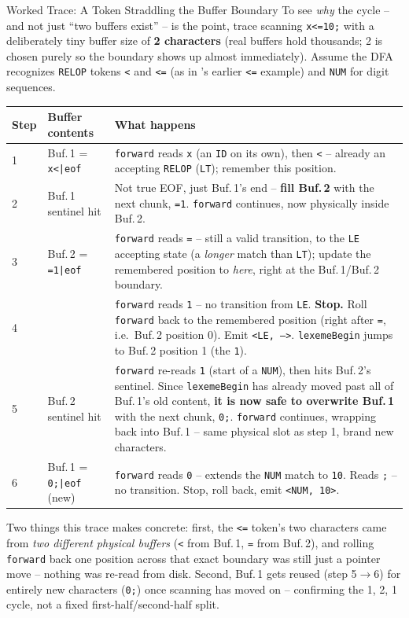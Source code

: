 \documentclass[full-course-notes.tex]{subfiles}
\begin{document}
\begin{examplebox}{Worked Trace: A Token Straddling the Buffer Boundary}
To see \emph{why} the cycle -- and not just ``two buffers exist'' -- is the point, trace
scanning \texttt{x<=10;} with a deliberately tiny buffer size of \textbf{2 characters} (real
buffers hold thousands; 2 is chosen purely so the boundary shows up almost immediately). Assume
the DFA recognizes \texttt{RELOP} tokens \texttt{<} and \texttt{<=} (as in
's earlier \texttt{<=} example) and \texttt{NUM} for digit
sequences.

\begin{center}
\renewcommand{\arraystretch}{1.3}
\small
\begin{tabularx}{\textwidth}{@{}l l X@{}}
\toprule
\textbf{Step} & \textbf{Buffer contents} & \textbf{What happens} \\
\midrule
1 & Buf.\,1 = \texttt{x<|eof} & \texttt{forward} reads \texttt{x} (an \texttt{ID} on its own),
then \texttt{<} -- already an accepting \texttt{RELOP} (\texttt{LT}); remember this position. \\
2 & Buf.\,1 sentinel hit & Not true EOF, just Buf.\,1's end -- \textbf{fill Buf.\,2} with the
next chunk, \texttt{=1}. \texttt{forward} continues, now physically inside Buf.\,2. \\
3 & Buf.\,2 = \texttt{=1|eof} & \texttt{forward} reads \texttt{=} -- still a valid transition,
to the \texttt{LE} accepting state (a \emph{longer} match than \texttt{LT}); update the
remembered position to \emph{here}, right at the Buf.\,1/Buf.\,2 boundary. \\
4 & & \texttt{forward} reads \texttt{1} -- no transition from \texttt{LE}. \textbf{Stop.} Roll
\texttt{forward} back to the remembered position (right after \texttt{=}, i.e.\ Buf.\,2
position 0). Emit \texttt{<LE, -->}. \texttt{lexemeBegin} jumps to Buf.\,2 position 1
(the \texttt{1}). \\
5 & Buf.\,2 sentinel hit & \texttt{forward} re-reads \texttt{1} (start of a \texttt{NUM}),
then hits Buf.\,2's sentinel. Since \texttt{lexemeBegin} has already moved past all of Buf.\,1's
old content, \textbf{it is now safe to overwrite Buf.\,1} with the next chunk, \texttt{0;}.
\texttt{forward} continues, wrapping back into Buf.\,1 -- same physical slot as step 1, brand
new characters. \\
6 & Buf.\,1 = \texttt{0;|eof} (new) & \texttt{forward} reads \texttt{0} -- extends the
\texttt{NUM} match to \texttt{10}. Reads \texttt{;} -- no transition. Stop, roll back, emit
\texttt{<NUM, 10>}. \\
\bottomrule
\end{tabularx}
\end{center}
Two things this trace makes concrete: first, the \texttt{<=} token's two characters came from
\emph{two different physical buffers} (\texttt{<} from Buf.\,1, \texttt{=} from Buf.\,2), and
rolling \texttt{forward} back one position across that exact boundary was still just a pointer
move -- nothing was re-read from disk. Second, Buf.\,1 gets reused (step 5$\to$6) for entirely
new characters (\texttt{0;}) once scanning has moved on -- confirming the 1, 2, 1 cycle, not a
fixed first-half/second-half split.
\end{examplebox}
\end{document}
